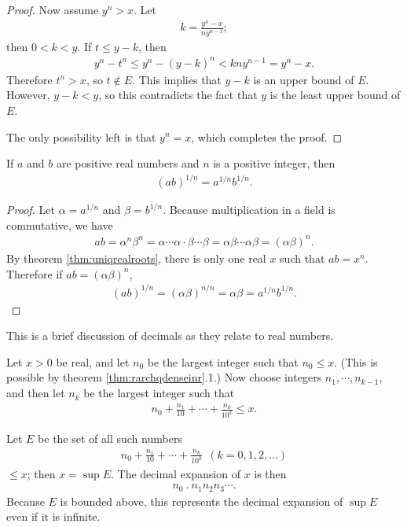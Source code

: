 \documentclass[12pt]{article}
\begin{document}
\begin{thm}
\begin{proof}
    Now assume $y^n > x$. Let
    \begin{align*}
      k = \frac{y^n - x}{ny^{n-1}};
    \end{align*}
    then $0 < k < y$. If $t \leq y - k$, then
    \begin{align*}
      y^n - t^n \leq y^n - (y - k)^n < kny^{n - 1} = y^n - x.
    \end{align*}
    Therefore $t^n > x$, so $t \notin E$. This implies that $y - k$ is an upper bound
    of $E$. However, $y - k < y$, so this contradicts the fact that $y$ is the least
    upper bound of $E$.

    The only possibility left is that $y^n = x$, which completes the proof.
  \end{proof}
\end{thm}

\begin{cor}
  If $a$ and $b$ are positive real numbers and $n$ is a positive integer, then
  \begin{align*}
    (ab)^{1/n} = a^{1/n}b^{1/n}.
  \end{align*}

  \begin{proof}
    Let $\alpha = a^{1/n}$ and $\beta = b^{1/n}$. Because multiplication in a field
    is commutative, we have
    \begin{align*}
      ab = \alpha^n\beta^n = \alpha \cdots \alpha \cdot \beta \cdots \beta =
      \alpha\beta \cdots \alpha\beta = (\alpha\beta)^n.
    \end{align*}
    By theorem \ref{thm:uniqrealroots}, there is only one real $x$ such that $ab =
    x^n$. Therefore if $ab = (\alpha\beta)^n$,
    \begin{align*}
      (ab)^{1/n} = (\alpha\beta)^{n/n} = \alpha\beta = a^{1/n}b^{1/n}.
    \end{align*}
  \end{proof}
\end{cor}

\begin{comm}
  This is a brief discussion of decimals as they relate to real numbers.

  Let $x > 0$ be real, and let $n_0$ be the largest integer such that $n_0 \leq x$.
  (This is possible by theorem \ref{thm:rarchqdenseinr}.1.) Now choose integers
  $n_1,\cdots,n_{k-1}$, and then let $n_k$ be the largest integer such that
  \begin{align*}
    n_0 + \frac{n_1}{10} + \cdots + \frac{n_k}{10^k} \leq x.
  \end{align*}

  Let $E$ be the set of all such numbers
  \begin{align*}
    n_0 + \frac{n_1}{10} + \cdots + \frac{n_k}{10^k}\ \ (k = 0,1,2,\ldots)
  \end{align*}
  $\leq x$; then $x = \sup E$. The decimal expansion of $x$ is then
  \begin{align*}
    n_0\ .\ n_1n_2n_3\cdots.
  \end{align*}
  Because $E$ is bounded above, this represents the decimal expansion of $\sup E$
  even if it is infinite.
\end{comm}
\end{document}
